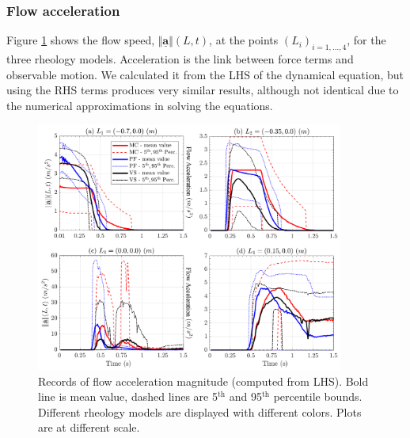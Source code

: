 \documentclass{article}
\begin{document}
\subsubsection{Flow acceleration}
Figure \ref{fig:Ramp-AccL} shows the flow speed, $\Vert \underline{\mathbf{a}} \Vert(L,t)$, at the points $(L_i)_{i=1,\dots,4}$, for the three rheology models. Acceleration is the link between force terms and observable motion. We calculated it from the LHS of the dynamical equation, but using the RHS terms produces very similar results, although not identical due to the numerical approximations in solving the equations.
\begin{figure}[H]
         \centering
        \includegraphics[width=0.9\textwidth]{InclinedPlane/LocalMeasurments/Acceleration.png}
        \caption{Records of flow acceleration magnitude (computed from LHS). Bold line is mean value, dashed lines are 5$^{\mathrm{th}}$ and 95$^{\mathrm{th}}$ percentile bounds. Different rheology models are displayed with different colors. Plots are at different scale.}
        \label{fig:Ramp-AccL}
\end{figure}
\end{document}
